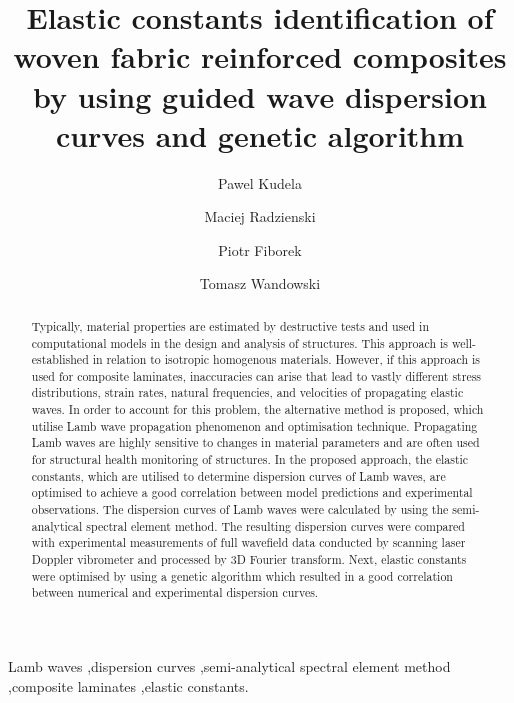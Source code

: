 \usepackage{amsmath,amssymb,bm}
\usepackage[colorlinks=true,citecolor=green]{hyperref}
\usepackage{verbatim}
\usepackage{caption}
\usepackage{subcaption}
\usepackage{booktabs} \usepackage{csvsimple} \newcommand{\matr}[1]{\mathbf{#1}} \newcommand{\vect}[1]{\mathbf{#1}} \newcommand{\ud}{\mathrm{d}}
\renewcommand{\vec}[1]{\mathbf{#1}}
\newcommand{\veca}[2]{\mathbf{#1}{#2}}
\renewcommand{\bm}[1]{\mathbf{#1}}
\newcommand{\bs}[1]{\boldsymbol{#1}}
\graphicspath{{figs/}{../../figures/}}

	\begin{frontmatter}
																																						
		\title{Elastic constants identification of woven fabric reinforced composites by using guided wave dispersion curves and genetic algorithm}
		
						\address[IFFM]{Institute of Fluid Flow Machinery, Polish Academy of Sciences, Poland}
		
		\author{Pawel Kudela}
		\author{Maciej Radzienski}
		\author{Piotr Fiborek }
				\author{Tomasz Wandowski }	
		
		
		\begin{abstract}
					Typically, material properties are estimated by destructive tests and used in computational models in the design and analysis  of structures. This approach is well-established in relation to isotropic homogenous materials. However, if this approach is used for composite laminates, inaccuracies can arise that lead to vastly different stress distributions, strain rates, natural frequencies, and velocities of propagating elastic waves. In order to account for this problem, the alternative method is proposed, which utilise Lamb wave propagation phenomenon and optimisation technique. Propagating Lamb waves are highly sensitive to changes in material parameters and are often used for structural health monitoring of structures. In the proposed approach, the elastic constants, which are utilised to determine dispersion curves of Lamb waves, are optimised to achieve a good correlation between model predictions and experimental observations. The dispersion curves of Lamb waves were calculated by using the semi-analytical spectral element method. The resulting dispersion curves were compared with experimental measurements of full wavefield data conducted by scanning laser Doppler vibrometer and processed by 3D Fourier transform. Next, elastic constants were optimised by using a genetic algorithm which resulted in a good correlation between numerical and experimental dispersion curves.
		\end{abstract}
		
		\begin{keyword}
						Lamb waves \sep dispersion curves \sep semi-analytical spectral element method \sep composite laminates \sep elastic constants.
						
									
		\end{keyword}
		
	\end{frontmatter}
	
